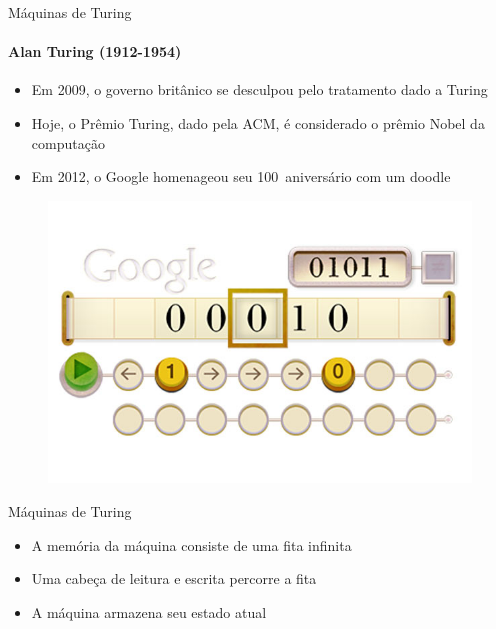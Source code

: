 \documentclass{beamer}
\begin{document}
\begin{frame}{Máquinas de Turing}
	\framesubtitle{Alan Turing (1912-1954)}
	\begin{itemize}
		\item Em 2009, o governo britânico se desculpou pelo tratamento dado a Turing
		\item Hoje, o Prêmio Turing, dado pela ACM, é considerado o prêmio Nobel da computação
		\item Em 2012, o Google homenageou seu 100\textordmasculine\ aniversário com um doodle
	\end{itemize}
	\begin{figure}
		\includegraphics[width=0.4\paperwidth]{resources/turing-doodle}
	\end{figure}
\end{frame}
\begin{frame}{Máquinas de Turing}
	\begin{itemize}
		\item A memória da máquina consiste de uma fita infinita
		\item Uma cabeça de leitura e escrita percorre a fita
		\item A máquina armazena seu estado atual
	\end{itemize}
	\begin{center}
		\renewcommand{\TuringInput} {a,b,a,b,$\sqcup$,$\sqcup$,$\sqcup$}
		\renewcommand{\TuringHead} 3
		\renewcommand{\TuringState} {$q_{1}$}
		\renewcommand{\TuringRightEnd} {$\ldots$}
		\renewcommand{\TuringLeftEnd} {}
		\TuringMachine
	\end{center}
\end{frame}
\end{document}
